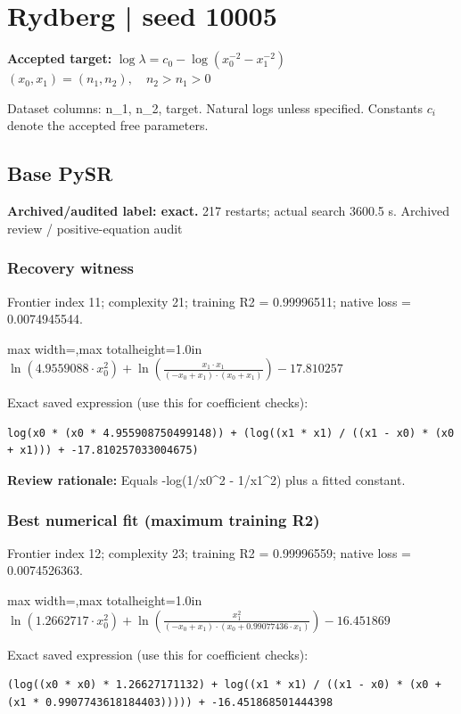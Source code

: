 \documentclass[10pt,letterpaper,landscape]{article}
\begin{document}
\section*{Rydberg | seed 10005}
\textbf{Accepted target:} $\displaystyle \log\lambda=c_0-\log\!\left(x_0^{-2}-x_1^{-2}\right)$\hfill $(x_0,x_1)=(n_1,n_2),\quad n_2>n_1>0$\par
{\small Dataset columns: n\_1, n\_2, target. Natural logs unless specified. Constants $c_i$ denote the accepted free parameters.}\par\medskip
\begin{minipage}[t]{0.485\textwidth}
\subsection*{Base PySR}
\textbf{Archived/audited label: exact.} 217 restarts; actual search 3600.5 s.
{\small Archived review / positive-equation audit}
\subsubsection*{Recovery witness}
Frontier index 11; complexity 21; training R2 = 0.99996511; native loss = 0.0074945544.
\begin{center}\begin{adjustbox}{max width=\linewidth,max totalheight=1.0in}$\displaystyle \ln{\left(4.9559088 \cdot x_{0}^{2} \right)} + \ln{\left(\frac{x_{1} \cdot x_{1}}{\left(- x_{0} + x_{1}\right) \cdot \left(x_{0} + x_{1}\right)} \right)} - 17.810257$\end{adjustbox}\end{center}
{\scriptsize Exact saved expression (use this for coefficient checks):}
\begin{lstlisting}
log(x0 * (x0 * 4.955908750499148)) + (log((x1 * x1) / ((x1 - x0) * (x0 + x1))) + -17.810257033004675)
\end{lstlisting}
{\small\textbf{Review rationale:} Equals -log(1/x0\textasciicircum{}2 - 1/x1\textasciicircum{}2) plus a fitted constant.}
\subsubsection*{Best numerical fit (maximum training R2)}
Frontier index 12; complexity 23; training R2 = 0.99996559; native loss = 0.0074526363.
\begin{center}\begin{adjustbox}{max width=\linewidth,max totalheight=1.0in}$\displaystyle \ln{\left(1.2662717 \cdot x_{0}^{2} \right)} + \ln{\left(\frac{x_{1}^{2}}{\left(- x_{0} + x_{1}\right) \cdot \left(x_{0} + 0.99077436 \cdot x_{1}\right)} \right)} - 16.451869$\end{adjustbox}\end{center}
{\scriptsize Exact saved expression (use this for coefficient checks):}
\begin{lstlisting}
(log((x0 * x0) * 1.26627171132) + log((x1 * x1) / ((x1 - x0) * (x0 + (x1 * 0.9907743618184403))))) + -16.451868501444398
\end{lstlisting}
\end{minipage}\hfill
\end{document}
